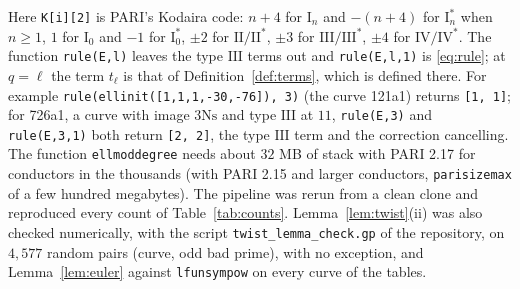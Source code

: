 \documentclass[11pt]{amsart}
\theoremstyle{definition}
\newcommand{\Ns}{3\mathrm{Ns}}
\begin{document}
Here \texttt{K[i][2]} is PARI's Kodaira code: $n+4$ for $\mathrm{I}_n$ and $-(n+4)$ for $\mathrm{I}_n^*$ when $n\ge1$, $1$ for $\mathrm{I}_0$ and $-1$ for $\mathrm{I}_0^*$, $\pm2$ for $\mathrm{II}/\mathrm{II}^*$, $\pm3$ for $\mathrm{III}/\mathrm{III}^*$, $\pm4$ for $\mathrm{IV}/\mathrm{IV}^*$. The function \texttt{rule(E,l)} leaves the type $\mathrm{III}$ terms out and \texttt{rule(E,l,1)} is \eqref{eq:rule}; at $q=\ell$ the term $t_\ell$ is that of Definition~\ref{def:terms}, which is defined there. For example \texttt{rule(ellinit([1,1,1,-30,-76]), 3)} (the curve 121a1) returns \texttt{[1, 1]}; for 726a1, a curve with image $\Ns$ and type $\mathrm{III}$ at $11$, \texttt{rule(E,3)} and \texttt{rule(E,3,1)} both return \texttt{[2, 2]}, the type $\mathrm{III}$ term and the correction cancelling. The function \texttt{ellmoddegree} needs about $32$ MB of stack with PARI 2.17 for conductors in the thousands (with PARI 2.15 and larger conductors, \texttt{parisizemax} of a few hundred megabytes). The pipeline was rerun from a clean clone and reproduced every count of Table~\ref{tab:counts}. Lemma~\ref{lem:twist}(ii) was also checked numerically, with the script \texttt{twist\_lemma\_check.gp} of the repository, on $4{,}577$ random pairs (curve, odd bad prime), with no exception, and Lemma~\ref{lem:euler} against \texttt{lfunsympow} on every curve of the tables.
\end{document}
